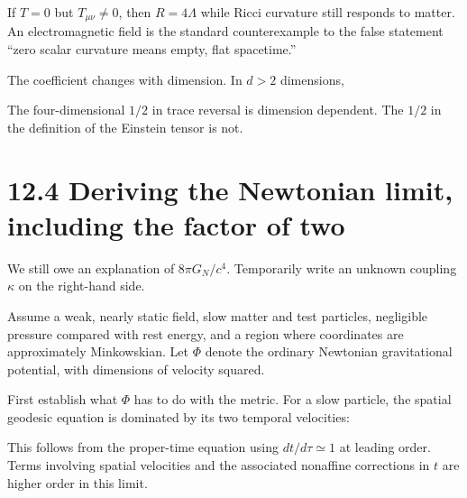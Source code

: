 \documentclass[
  11pt,
  letterpaper,
  oneside,
  openany]{scrbook}
\begin{document}
If \(T=0\) but \(T_{\mu\nu}\ne0\), then \(R=4\Lambda\) while Ricci
curvature still responds to matter. An electromagnetic field is the
standard counterexample to the false statement ``zero scalar curvature
means empty, flat spacetime.''

The coefficient changes with dimension. In \(d>2\) dimensions,

\begin{center}
\begingroup
{}
\ifdim\wd\grmathbox>\linewidth
\resizebox{\linewidth}{!}{\usebox{\grmathbox}}
\else\usebox{\grmathbox}\fi
\endgroup
\end{center}

The four-dimensional \(1/2\) in trace reversal is dimension dependent.
The \(1/2\) in the definition of the Einstein tensor is not.

\hypertarget{deriving-the-newtonian-limit-including-the-factor-of-two}{%
\section{12.4 Deriving the Newtonian limit, including the factor of
two}\label{deriving-the-newtonian-limit-including-the-factor-of-two}}

We still owe an explanation of \(8\pi G_N/c^4\). Temporarily write an
unknown coupling \(\kappa\) on the right-hand side.

Assume a weak, nearly static field, slow matter and test particles,
negligible pressure compared with rest energy, and a region where
coordinates are approximately Minkowskian. Let \(\Phi\) denote the
ordinary Newtonian gravitational potential, with dimensions of velocity
squared.

First establish what \(\Phi\) has to do with the metric. For a slow
particle, the spatial geodesic equation is dominated by its two temporal
velocities:

\begin{center}
\begingroup
{}
\ifdim\wd\grmathbox>\linewidth
\resizebox{\linewidth}{!}{\usebox{\grmathbox}}
\else\usebox{\grmathbox}\fi
\endgroup
\end{center}

This follows from the proper-time equation using \(dt/d\tau\simeq1\) at
leading order. Terms involving spatial velocities and the associated
nonaffine corrections in \(t\) are higher order in this limit.
\end{document}
